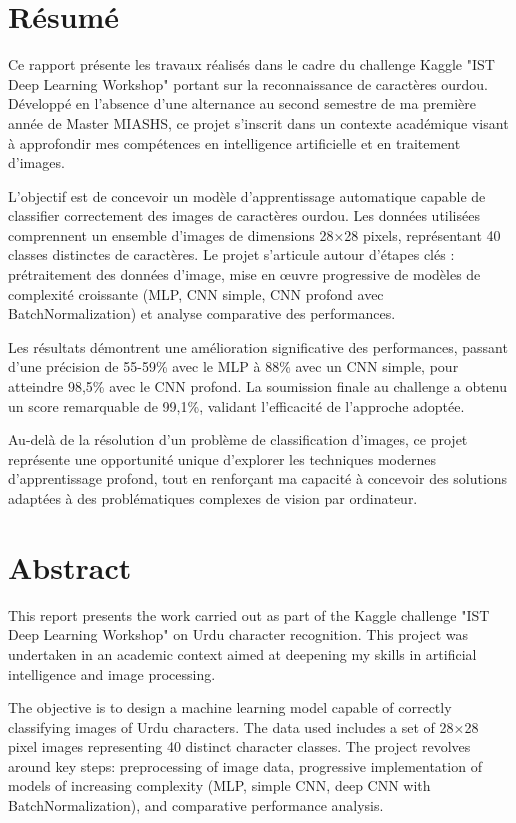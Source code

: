 \section*{Résumé}

Ce rapport présente les travaux réalisés dans le cadre du challenge Kaggle "IST Deep Learning Workshop" portant sur la reconnaissance de caractères ourdou. Développé en l’absence d’une alternance au second semestre de ma première année de Master MIASHS, ce projet s'inscrit dans un contexte académique visant à approfondir mes compétences en intelligence artificielle et en traitement d'images.

L'objectif est de concevoir un modèle d'apprentissage automatique capable de classifier correctement des images de caractères ourdou. Les données utilisées comprennent un ensemble d'images de dimensions 28×28 pixels, représentant 40 classes distinctes de caractères. Le projet s'articule autour d'étapes clés : prétraitement des données d'image, mise en œuvre progressive de modèles de complexité croissante (MLP, CNN simple, CNN profond avec BatchNormalization) et analyse comparative des performances.

Les résultats démontrent une amélioration significative des performances, passant d'une précision de 55-59\% avec le MLP à 88\% avec un CNN simple, pour atteindre 98,5\% avec le CNN profond. La soumission finale au challenge a obtenu un score remarquable de 99,1\%, validant l'efficacité de l'approche adoptée.

Au-delà de la résolution d'un problème de classification d'images, ce projet représente une opportunité unique d'explorer les techniques modernes d'apprentissage profond, tout en renforçant ma capacité à concevoir des solutions adaptées à des problématiques complexes de vision par ordinateur.

\section*{Abstract}

This report presents the work carried out as part of the Kaggle challenge "IST Deep Learning Workshop" on Urdu character recognition. This project was undertaken in an academic context aimed at deepening my skills in artificial intelligence and image processing.

The objective is to design a machine learning model capable of correctly classifying images of Urdu characters. The data used includes a set of 28×28 pixel images representing 40 distinct character classes. The project revolves around key steps: preprocessing of image data, progressive implementation of models of increasing complexity (MLP, simple CNN, deep CNN with BatchNormalization), and comparative performance analysis.

